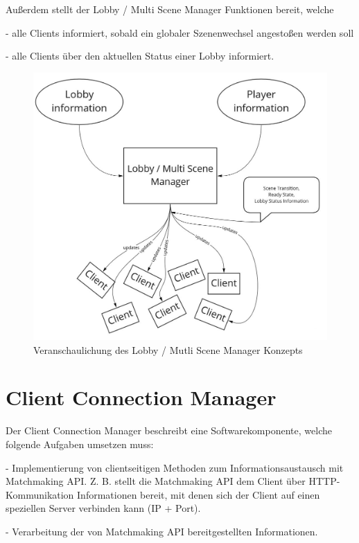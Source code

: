 Außerdem stellt der Lobby / Multi Scene Manager Funktionen bereit, welche

- alle Clients informiert, sobald ein globaler Szenenwechsel angestoßen werden soll

- alle Clients über den aktuellen Status einer Lobby informiert.

\begin{figure}[H]
	\centering
	\includegraphics[width=150mm]{images/Lobby_Multi_Scene_Manager.jpg}
	\caption[Lobby / Mutli Scene Manager Diagramm]{Veranschaulichung des Lobby / Mutli Scene Manager Konzepts}
	\label{pic:Lobby_Multi_Scene_Manager}
\end{figure}


\section{Client Connection Manager}

Der Client Connection Manager beschreibt eine Softwarekomponente, welche folgende Aufgaben umsetzen muss:

- Implementierung von clientseitigen Methoden zum Informationsaustausch mit Matchmaking API.
Z. B. stellt die Matchmaking API dem Client über HTTP-Kommunikation Informationen bereit, mit denen sich der Client auf einen speziellen Server verbinden kann (IP + Port). \cite{Wikipedia.2021d} \cite{Wikipedia.2021e}

- Verarbeitung der von Matchmaking API bereitgestellten Informationen. 

